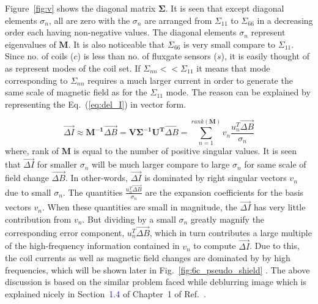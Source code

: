  
Figure~\ref{fig:v} shows the diagonal matrix $\bm{\Sigma}$. It is seen that except diagonal elements $\sigma_n$, all are zero with the $\sigma_n$ are arranged from $\Sigma_{11}$ to $\Sigma_{66}$ in a decreasing order each having non-negative values. The diagonal elements $\sigma_n$ represent eigenvalues of $\bm{M}$. It is also noticeable that $\Sigma_{66}$ is very small compare to $\Sigma_{11}$. Since no. of coils ($c$) is less than no. of fluxgate sensors ($s$), it is easily thought of as represent modes of the coil set.  If $\Sigma_{nn}<<\Sigma_{11}$ it means that mode corresponding to  $\Sigma_{nn}$ requires a much larger current in order to generate the same scale of magnetic field as for the $\Sigma_{11}$ mode. The reason can be explained by representing the Eq.~(\ref{eq:del_I}) in vector form.

\begin{equation}\label{eq:del_I_pseudo}
    \Vec{\Delta I} \approx\bm{M^{-1}}\Vec{\Delta B}=\bm{V \Sigma^{-1} U^T}\Vec{\Delta B}=\sum_{n=1}^{rank(\bm{M})}v_n\frac{u_n^T \Vec{\Delta B}}{ \sigma_n}
\end{equation}
where, rank of $\bm{M}$ is equal to the number of positive singular values. It is seen that $\Vec{\Delta I}$ for smaller $\sigma_n$ will be much larger compare to large $\sigma_n$ for same scale of field change $\Vec{\Delta B}$. In other-words, $\Vec{\Delta I}$ is dominated by right singular vectors $v_n$ due to small $\sigma_n$. The quantities $\frac{u_n^T \Vec{\Delta B}}{ \sigma_n}$ are the expansion coefficients for the basis vectors $v_n$. When these quantities are small in magnitude, the $\Vec{\Delta I}$ has very little contribution from $v_n$. But dividing by a small $\sigma_n$ greatly magnify the corresponding error component, $u_n^T \Vec{\Delta B}$, which in turn contributes a large multiple of the high-frequency information contained in $v_n$ to compute $\Vec{\Delta I}$. Due to this, the coil currents as well as magnetic field changes are dominated by by high frequencies, which will be shown later in Fig.~\ref{fig:6c_pseudo_shield} . The above discussion is based on the similar problem faced while deblurring image which is explained nicely in Section~\textcolor{blue}{1.4} of Chapter~\textcolor{blue}{1} of Ref.~\cite{svd4}.

